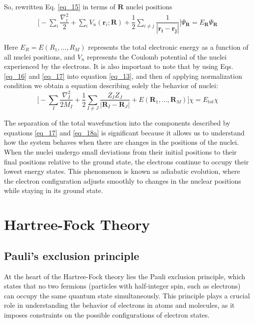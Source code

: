 So, rewritten Eq. \ref{eq_15} in terms of $\mathbf{R}$ nuclei positions 
\begin{equation} \label{eq_17}
    \begin{split}
		\Biggl[-\sum_{i}\dfrac{\nabla_{i}^{2}}{2} +\sum_{i}V_{n}(\mathbf{r}_{i};\mathbf{R})+\dfrac{1}{2}\sum_{i\neq j} \dfrac{1}{|\mathbf{r_i}-\mathbf{r_{j}}|}  \Biggr]\Psi_{\mathbf{R}} =E_{\mathbf{R}} \Psi_{\mathbf{R}}
	\end{split}
\end{equation}


Here $E_{R}=E\left(R_{1}, ..., R_{M} \right)$ represents the total electronic energy as a function of all nuclei positions, and $V_{n}$ represents the Coulomb potential of the nuclei experienced by the electrons. It is  also important to note that by using Eqs. \ref{eq_16} and \ref{eq_17} into equation \ref{eq_13}, and then of applying normalization condition we obtain a equation describing solely the behavior of nuclei:
\begin{equation} \label{eq_18a}
    \Biggl[-\sum_{I}\dfrac{\nabla_{I}^{2}}{2M_{I}}+\dfrac{1}{2}\sum_{I\neq J}\dfrac{Z_I Z_J}{|\mathbf{R}_I-\mathbf{R}_J|}+E\left(\mathbf{R}_1, ..., \mathbf{R}_M \right) \Biggr]\chi = E_{tot}\chi
\end{equation}

The separation of the total wavefunction into the components described by equations \ref{eq_17} and \ref{eq_18a} is significant because it allows us to understand how the system behaves when there are changes in the positions of the nuclei. When the nuclei undergo small deviations from their initial positions to their final positions relative to the ground state, the electrons continue to occupy their lowest energy states. This phenomenon is known as adiabatic evolution, where the electron configuration adjusts smoothly to changes in the nuclear positions while staying in its ground state.

\section{Hartree-Fock Theory}

\subsection{Pauli's exclusion principle}
At the heart of the Hartree-Fock theory lies the Pauli exclusion principle, which states that no two fermions (particles with half-integer spin, such as electrons) can occupy the same quantum state simultaneously. This principle plays a crucial role in understanding the behavior of electrons in atoms and molecules, as it imposes constraints on the possible configurations of electron states.

